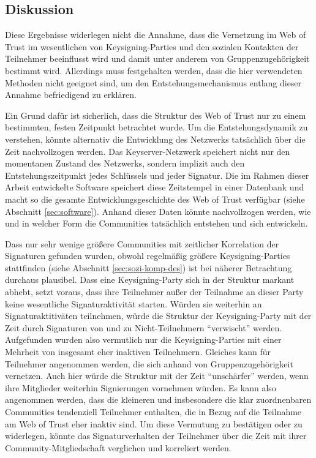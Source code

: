 \subsection{Diskussion}
\label{sec:gesamtb-comm}

Diese Ergebnisse widerlegen nicht die Annahme, dass die Vernetzung im
Web of Trust im wesentlichen von Keysigning-Parties und den sozialen
Kontakten der Teilnehmer beeinflusst wird und damit unter anderem von
Gruppenzugehörigkeit bestimmt wird. Allerdings muss festgehalten
werden, dass die hier verwendeten Methoden nicht geeignet sind, um den
Entstehungsmechanismus entlang dieser Annahme befriedigend zu
erklären. 

Ein Grund dafür ist sicherlich, dass die Struktur des Web of Trust nur
zu einem bestimmten, festen Zeitpunkt betrachtet wurde. Um die
Entstehungsdynamik zu verstehen, könnte alternativ die Entwicklung des
Netzwerks tatsächlich über die Zeit nachvollzogen werden. Das
Keyserver-Netzwerk speichert nicht nur den momentanen Zustand des
Netzwerks, sondern implizit auch den Entstehungszeitpunkt jedes
Schlüssels und jeder Signatur. Die im Rahmen dieser Arbeit entwickelte
Software speichert diese Zeitstempel in einer Datenbank und macht so
die gesamte Entwicklungsgeschichte des Web of Trust verfügbar (siehe
Abschnitt \ref{sec:software}). Anhand dieser Daten könnte
nachvollzogen werden, wie und in welcher Form die Communities
tatsächlich entstehen und sich entwickeln.

Dass nur sehr wenige grö{\ss}ere Communities mit zeitlicher Korrelation
der Signaturen gefunden wurden, obwohl regelmäßig grö{\ss}ere
Keysigning-Parties stattfinden (siehe Abschnitt
\ref{sec:sozi-komp-des}) ist bei näherer Betrachtung durchaus
plausibel. Dass eine Keysigning-Party sich in der Struktur markant
abhebt, setzt voraus, dass ihre Teilnehmer außer der Teilnahme an
dieser Party keine wesentliche Signaturaktivität starten. Würden
sie weiterhin an Signaturaktitiväten teilnehmen, würde die
Struktur der Keysigning-Party mit der Zeit durch Signaturen von und zu
Nicht-Teilnehmern ``verwischt'' werden. Aufgefunden wurden also
vermutlich nur die Keysigning-Parties mit einer Mehrheit von insgesamt
eher inaktiven Teilnehmern. Gleiches kann für Teilnehmer angenommen
werden, die sich anhand von Gruppenzugehörigkeit vernetzen. Auch
hier würde die Struktur mit der Zeit ``unschärfer'' werden, wenn
ihre Mitglieder weiterhin Signierungen vornehmen würden. Es kann
also angenommen werden, dass die kleineren und insbesondere die klar
zuordnenbaren Communities tendenziell Teilnehmer enthalten, die in
Bezug auf die Teilnahme am Web of Trust eher inaktiv sind. Um diese
Vermutung zu bestätigen oder zu widerlegen, könnte das
Signaturverhalten der Teilnehmer über die Zeit mit ihrer
Community-Mitgliedschaft verglichen und korreliert werden.

